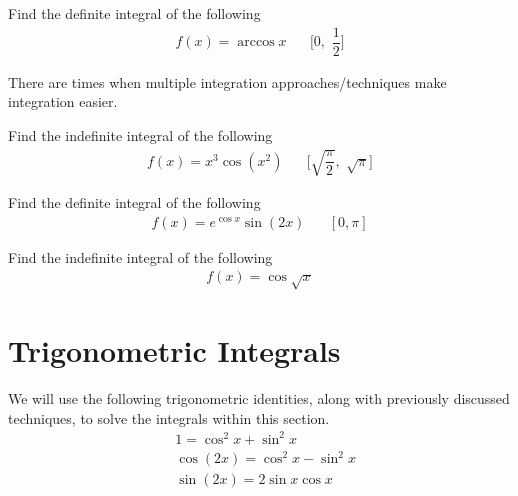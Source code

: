 \begin{exercise}
Find the definite integral of the following
\begin{align*}
    f(x) = \arccos x \hspace{20pt} \Big[0, \hspace{4pt} \dfrac{1}{2}\Big]
\end{align*}
\end{exercise}

\begin{note}
There are times when multiple integration approaches/techniques make integration easier.
\end{note}

\begin{exercise}
Find the indefinite integral of the following
\begin{align*}
    f(x) = x^{3} \cos(x^{2}) \hspace{20pt} \Big[\sqrt{\dfrac{\pi}{2}}, \hspace{4pt} \sqrt{\pi} \Big]
\end{align*}
\end{exercise}

\begin{exercise}
Find the definite integral of the following
\begin{align*}
    f(x) = e^{\cos x} \sin(2x) \hspace{20pt} [0, \pi]
\end{align*}
\end{exercise}

\begin{exercise}
Find the indefinite integral of the following
\begin{align*}
    f(x) = \cos \sqrt{x}
\end{align*}
\end{exercise}

\newpage
\section{Trigonometric Integrals}

\begin{recall}
We will use the following trigonometric identities, along with previously discussed techniques, to solve the integrals within this section.
\begin{align*}
    &1 = \cos^{2} x + \sin^{2} x\\[2ex]
    &\cos(2x) = \cos^{2} x - \sin^{2} x\\[2ex]
    &\sin(2x) = 2\sin x \cos x
\end{align*}
\end{recall}

